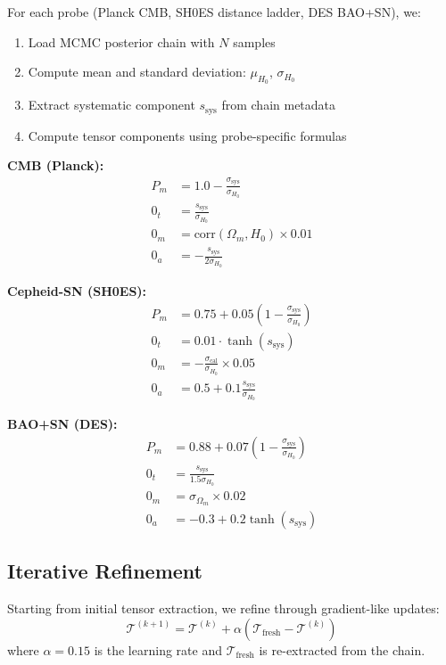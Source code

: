 \documentclass[12pt,a4paper]{article}
\begin{document}
For each probe (Planck CMB, SH0ES distance ladder, DES BAO+SN), we:
\begin{enumerate}
\item Load MCMC posterior chain with $N$ samples
\item Compute mean and standard deviation: $\mu_{H_0}$, $\sigma_{H_0}$
\item Extract systematic component $s_{\text{sys}}$ from chain metadata
\item Compute tensor components using probe-specific formulas
\end{enumerate}

\textbf{CMB (Planck):}
\begin{align}
P_m &= 1.0 - \frac{\sigma_{\text{sys}}}{\sigma_{H_0}} \\
0_t &= \frac{s_{\text{sys}}}{\sigma_{H_0}} \\
0_m &= \text{corr}(\Omega_m, H_0) \times 0.01 \\
0_a &= -\frac{s_{\text{sys}}}{2\sigma_{H_0}}
\end{align}

\textbf{Cepheid-SN (SH0ES):}
\begin{align}
P_m &= 0.75 + 0.05\left(1 - \frac{\sigma_{\text{sys}}}{\sigma_{H_0}}\right) \\
0_t &= 0.01 \cdot \tanh(s_{\text{sys}}) \\
0_m &= -\frac{\sigma_{\text{cal}}}{\sigma_{H_0}} \times 0.05 \\
0_a &= 0.5 + 0.1\frac{s_{\text{sys}}}{\sigma_{H_0}}
\end{align}

\textbf{BAO+SN (DES):}
\begin{align}
P_m &= 0.88 + 0.07\left(1 - \frac{\sigma_{\text{sys}}}{\sigma_{H_0}}\right) \\
0_t &= \frac{s_{\text{sys}}}{1.5\sigma_{H_0}} \\
0_m &= \sigma_{\Omega_m} \times 0.02 \\
0_a &= -0.3 + 0.2\tanh(s_{\text{sys}})
\end{align}

\subsection{Iterative Refinement}

Starting from initial tensor extraction, we refine through gradient-like updates:
\begin{equation}
\mathcal{T}^{(k+1)} = \mathcal{T}^{(k)} + \alpha \left( \mathcal{T}_{\text{fresh}} - \mathcal{T}^{(k)} \right)
\end{equation}
where $\alpha = 0.15$ is the learning rate and $\mathcal{T}_{\text{fresh}}$ is re-extracted from the chain.
\end{document}
